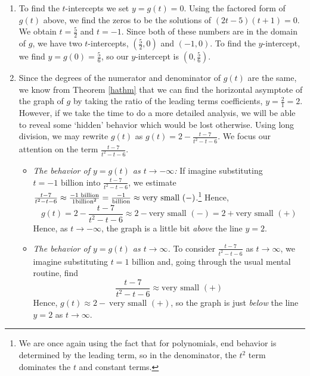 \begin{ex}
\begin{enumerate}
\item  To find the $t$-intercepts  we set $y = g(t) = 0$.  Using the factored form of $g(t)$ above, we find the zeros to be the solutions of $(2t-5)(t+1)=0$.  We obtain $t = \frac{5}{2}$ and $t=-1$. Since both of these numbers are in the domain of $g$, we have two $t$-intercepts, $\left( \frac{5}{2},0\right)$ and $(-1,0)$.  To find the $y$-intercept, we find $y = g(0) = \frac{5}{6}$, so our $y$-intercept is $\left(0, \frac{5}{6}\right)$.

\item  Since the degrees of the numerator and denominator of $g(t)$ are the same, we know from Theorem \ref{hathm} that we can find the horizontal asymptote of the graph of $g$ by taking the ratio of the leading terms coefficients, $y = \frac{2}{1} = 2$.  However, if we take the time to do a more detailed analysis, we will be able to reveal some `hidden' behavior which would be lost otherwise.  Using long division, we may rewrite $g(t)$ as $g(t) = 2 - \frac{t-7}{t^2-t-6}.$  We focus our attention on the term $\frac{t-7}{t^2-t-6}$.  

\begin{itemize}

\item  \textit{The behavior of $y=g(t)$ as $t \rightarrow -\infty$:} If imagine substituting $t = \text{$-1$ billion}$ into $\frac{t-7}{t^2-t-6}$, we estimate $\frac{t-7}{t^2-t-6} \approx \frac{\text{\scriptsize $-1$ billion}}{1 \text{\scriptsize billion}^2}  = \frac{-1}{\text{\scriptsize billion}} \approx \text{very small $(-)$}$.\footnote{We are once again using the fact that for polynomials, end behavior is determined by the leading term, so in the denominator, the $t^2$ term dominates the $t$ and constant terms.}  Hence, \[g(t) =  2 - \frac{t-7}{t^2-t-6} \approx 2 - \text{very small $(-)$} = 2 + \text{very small $(+)$}\]  Hence, as $t \rightarrow -\infty$, the graph is a little bit \textit{above} the line $y=2$.

\item  \textit{The behavior of $y=g(t)$ as $t \rightarrow \infty$.}  To consider $\frac{t-7}{t^2-t-6}$ as $t \rightarrow \infty$, we imagine substituting $t= \text{$1$ billion}$ and, going through the usual mental routine, find \[\frac{t-7}{t^2-t-6} \approx \text{very small $(+)$}\]  Hence, $g(t) \approx 2 - \ \text{very small $(+)$}$, so the graph is just \textit{below} the line $y=2$ as $t \rightarrow \infty$.

\end{itemize}


\end{enumerate}
\end{ex}
